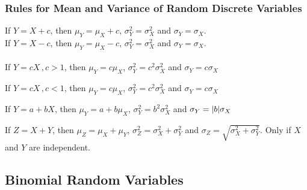 \documentclass[12pt letter]{report}
\begin{document}
\subsubsection{Rules for Mean and Variance of Random Discrete Variables}


If $Y = X + c$, then $\mu_{Y} = \mu_{X} + c$, $\sigma_{Y}^2 = \sigma_{X}^2$ and $\sigma_{Y} = \sigma_{X}$. \\

If $Y = X - c$, then $\mu_{Y} = \mu_{X} - c$, $\sigma_{Y}^2 = \sigma_{X}^2$ and $\sigma_{Y} = \sigma_{X}$. \\

 \\
If $Y = cX\, , c > 1$, then $\mu_{Y} = c \mu_{X}$, $\sigma_{Y}^2 = c^2 \sigma_{X}^2$ and $\sigma_{Y} = c \sigma_{X}$ \\


If $Y = cX\, , c < 1$, then $\mu_{Y} = c \mu_{X}$, $\sigma_{Y}^2 = c^2 \sigma_{X}^2$ and $\sigma_{Y} = c \sigma_{X}$ \\


If $Y = a + bX$, then $\mu_{Y} = a + b \mu_{X}$, $\sigma_{Y}^2 = b^2 \sigma_{X}^2$ and $\sigma_{Y} = \lvert b\rvert \sigma_{X}$ \\


If $Z = X + Y$, then $\mu_{Z} = \mu_{X} + \mu_{Y}$, $\sigma_{Z}^2 = \sigma_{X}^2 + \sigma_{Y}^2$ and $\sigma_{Z} =
	\sqrt{\sigma_{X}^2 + \sigma_{Y}^2}$. Only if $X$ and $Y$ are independent. \\

\subsection{Binomial Random Variables}

\end{document}
